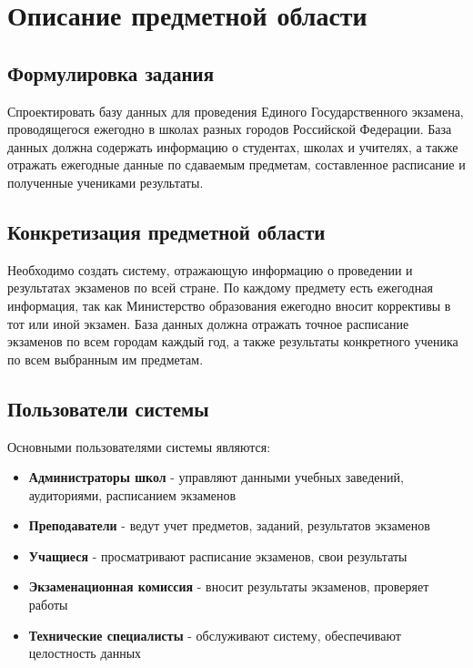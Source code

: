 \documentclass[a4paper]{article}
\begin{document}


\tableofcontents

\newpage

\section{Описание предметной области}

\subsection{Формулировка задания}
Спроектировать базу данных для проведения Единого Государственного
экзамена, проводящегося ежегодно в школах разных городов Российской
Федерации. База данных должна содержать информацию о студентах, школах и
учителях, а также отражать ежегодные данные по сдаваемым предметам,
составленное расписание и полученные учениками результаты.

\subsection{Конкретизация предметной области}
Необходимо создать систему, отражающую информацию о проведении и
результатах экзаменов по всей стране. По каждому предмету есть ежегодная
информация, так как Министерство образования ежегодно вносит коррективы в тот
или иной экзамен. База данных должна отражать точное расписание экзаменов по
всем городам каждый год, а также результаты конкретного ученика по всем выбранным им предметам.

\subsection{Пользователи системы}
Основными пользователями системы являются:
\begin{itemize}
      \item \textbf{Администраторы школ} - управляют данными учебных заведений, аудиториями, расписанием экзаменов
      \item \textbf{Преподаватели} - ведут учет предметов, заданий, результатов экзаменов
      \item \textbf{Учащиеся} - просматривают расписание экзаменов, свои результаты
      \item \textbf{Экзаменационная комиссия} - вносит результаты экзаменов, проверяет работы
      \item \textbf{Технические специалисты} - обслуживают систему, обеспечивают целостность данных
\end{itemize}
\end{document}
